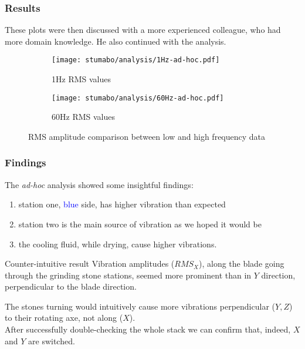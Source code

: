 \begin{frame}
    \frametitle{Results}
    \vspace*{\fill}
    These plots were then discussed with a more experienced colleague, who had more domain knowledge.
    He also continued with the analysis.
    \begin{figure}[htp]
        \begin{subfigure}{.495\textwidth}
            \texttt{[image: stumabo/analysis/1Hz-ad-hoc.pdf]}
            \caption{1Hz RMS values}
            \label{fig:stu_1Hz_rms}
        \end{subfigure}
        \begin{subfigure}{.495\textwidth}
            \texttt{[image: stumabo/analysis/60Hz-ad-hoc.pdf]}
            \caption{60Hz RMS values}
            \label{fig:stu_60Hz_rms}
        \end{subfigure}
        \caption{RMS amplitude comparison between low and high frequency data}
        \label{fig:stu_3_rms}
    \end{figure}

    \vspace*{\fill}
\end{frame}


\begin{frame}
    \frametitle{Findings}
    \vspace*{\fill}

    The \textit{ad-hoc} analysis showed some insightful findings:
    \begin{enumerate}
        \item station one, \textcolor{blue}{blue} side, has higher vibration than expected
        \item station two is the main source of vibration as we hoped it would be
        \item the cooling fluid, while drying, cause higher vibrations.
    \end{enumerate}
    
    \begin{alertblock}{Counter-intuitive result}
        Vibration amplitudes ($RMS_{X}$), along the blade going through the grinding stone stations, seemed more
        prominent than in $Y$ direction, perpendicular to the blade direction.
    \end{alertblock}
    
    The stones turning would intuitively cause
    more vibrations perpendicular ($Y, Z$) to their rotating axe, not along ($X$).\\
    After successfully double-checking the whole stack we can confirm that, indeed, $X$ and $Y$ are  switched.
    \vspace*{\fill}
\end{frame}